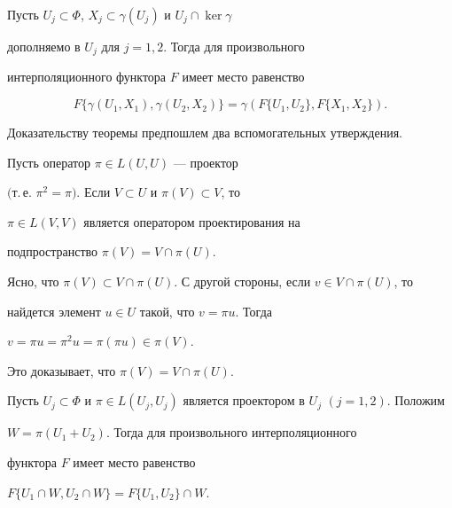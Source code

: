 \begin{thms} \label{tinterp}


Пусть $U_j \subset


\Phi$, $X_j \subset \gamma(U_j)$ и $U_j \cap \ker \gamma$


дополняемо в $U_j$ для $j=1,2$. Тогда для произвольного


интерполяционного функтора $F$ имеет место равенство


$$


F\{\gamma(U_1,X_1), \gamma(U_2,X_2) \} =


\gamma (F\{U_1,U_2\}, F\{X_1,X_2\}).


$$


\end{thms}





Доказательству теоремы предпошлем два вспомогательных утверждения.





\begin{lems} \label{proector}


Пусть оператор $\pi \in L(U,U)$ --- проектор


$($т.\,е. $\pi^2=\pi)$. Если $V \subset U$ и $\pi(V) \subset V$, то


$\pi \in L(V,V)$ является оператором проектирования на


подпространство $\pi(V)=V \cap \pi(U)$.


\end{lems}





\begin{pf}


Ясно, что $\pi(V) \subset V \cap


\pi(U)$. С другой стороны, если $v \in V \cap \pi(U)$, то


найдется элемент $u \in U$ такой, что $v=\pi u$. Тогда


$v=\pi u=\pi^2 u=\pi(\pi u) \in \pi(V)$.


Это доказывает, что $\pi(V)=V \cap \pi(U)$.


\end{pf}





\begin{lems} \label{lemmainterp}


Пусть $U_j \subset \Phi$ и $\pi \in


L(U_j,U_j)$ является проектором в $U_j$ $(j=1,2)$. Положим


$W=\pi(U_1+U_2)$. Тогда для произвольного интерполяционного


функтора $F$ имеет место равенство


$F\{U_1 \cap W, U_2 \cap W \}=F\{U_1,U_2\} \cap W$.


\end{lems}





